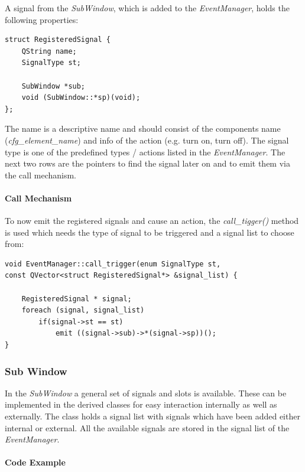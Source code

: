\documentclass[10pt,a4paper]{article}
\begin{document}
		A signal from the \textit{SubWindow}, which is added to the \textit{EventManager}, holds the following properties:
		
\begin{lstlisting}[caption=EventManager.h]
struct RegisteredSignal {
	QString name;
	SignalType st;

	SubWindow *sub;
	void (SubWindow::*sp)(void);
};
\end{lstlisting}

			The name is a descriptive name and should consist of the components name (\textit{cfg\_element\_name}) and info of the action (e.g. turn on, turn off). The signal type is one of the predefined types / actions listed in the \textit{EventManager}. The next two rows are the pointers to find the signal later on and to emit them via the call mechanism.

		\paragraph{Call Mechanism}
		
		To now emit the registered signals and cause an action, the \textit{call\_tigger()} method is used which needs the type of signal to be triggered and a signal list to choose from:
		
\begin{lstlisting}[caption=EventManager.cpp]
void EventManager::call_trigger(enum SignalType st,
const QVector<struct RegisteredSignal*> &signal_list) {

    RegisteredSignal * signal;
    foreach (signal, signal_list)
        if(signal->st == st)
            emit ((signal->sub)->*(signal->sp))();
}
\end{lstlisting}

	\subsubsection{Sub Window}
	
	In the \textit{SubWindow} a general set of signals and slots is available. These can be implemented in the derived classes for easy interaction internally as well as externally. The class holds a signal list with signals which have been added either internal or external. All the available signals are stored in the signal list of the \textit{EventManager}.

		\paragraph{Code Example}
\end{document}
